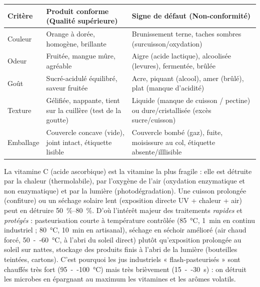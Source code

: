 \documentclass[11pt]{article}
\begin{document}
\begin{exemplebox}
\begin{center}
\begin{tabularx}{\linewidth}{|l|X|X|}
\hline
\rowcolor{popblueL} \textbf{Critère} & \textbf{Produit conforme (Qualité supérieure)} & \textbf{Signe de défaut (Non-conformité)} \\
\hline
Couleur & Orange à dorée, homogène, brillante & Brunissement terne, taches sombres (surcuisson/oxydation) \\
\hline
Odeur & Fruitée, mangue mûre, agréable & Aigre (acide lactique), alcoolisée (levures), fermentée, brûlée \\
\hline
Goût & Sucré-acidulé équilibré, saveur fruitée & Acre, piquant (alcool), amer (brûlé), plat (manque d'acidité) \\
\hline
Texture & Gélifiée, nappante, tient sur la cuillère (test de la goutte) & Liquide (manque de cuisson / pectine) ou dure/cristallisée (excès sucre/cuisson) \\
\hline
Emballage & Couvercle concave (vide), joint intact, étiquette lisible & Couvercle bombé (gaz), fuite, moisissure au col, étiquette absente/illlisible \\
\hline
\end{tabularx}
\end{center}
\end{exemplebox}

\begin{savaistu}
La vitamine C (acide ascorbique) est la vitamine la plus fragile : elle est détruite par la chaleur (thermolabile), par l'oxygène de l'air (oxydation enzymatique et non enzymatique) et par la lumière (photodégradation). Une cuisson prolongée (confiture) ou un séchage solaire lent (exposition directe UV + chaleur + air) peut en détruire \SIrange{50}{80}{\percent}. D'où l'intérêt majeur des traitements \emph{rapides} et \emph{protégés} : pasteurisation courte à température contrôlée (\SI{85}{\celsius}, \SI{1}{min} en continu industriel ; \SI{80}{\celsius}, \SI{10}{min} en artisanal), séchage en séchoir amélioré (air chaud forcé, \SI{50}{--}\SI{60}{\celsius}, à l'abri du soleil direct) plutôt qu'exposition prolongée au soleil sur nattes, stockage des produits finis à l'abri de la lumière (bouteilles teintées, cartons). C'est pourquoi les jus industriels « flash-pasteurisés » sont chauffés très fort (\SI{95}{--}\SI{100}{\celsius}) mais très brièvement (\SI{15}{--}\SI{30}{s}) : on détruit les microbes en épargnant au maximum les vitamines et les arômes volatils.
\end{savaistu}
\end{document}
